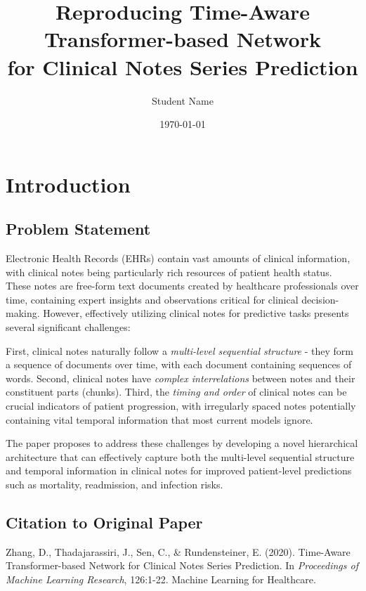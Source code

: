 \documentclass[10pt,letterpaper,twocolumn]{article}
\title{\textbf{Reproducing Time-Aware Transformer-based Network\\for Clinical Notes Series Prediction}}
\author{Student Name}
\date{\today}
\begin{document}
\twocolumn[
  \begin{@twocolumnfalse}
    \maketitle
    \thispagestyle{empty}
  \end{@twocolumnfalse}
]

\section{Introduction}

\subsection{Problem Statement}
Electronic Health Records (EHRs) contain vast amounts of clinical information, with clinical notes being particularly rich resources of patient health status. These notes are free-form text documents created by healthcare professionals over time, containing expert insights and observations critical for clinical decision-making. However, effectively utilizing clinical notes for predictive tasks presents several significant challenges:

First, clinical notes naturally follow a \textit{multi-level sequential structure} - they form a sequence of documents over time, with each document containing sequences of words. Second, clinical notes have \textit{complex interrelations} between notes and their constituent parts (chunks). Third, the \textit{timing and order} of clinical notes can be crucial indicators of patient progression, with irregularly spaced notes potentially containing vital temporal information that most current models ignore.

The paper proposes to address these challenges by developing a novel hierarchical architecture that can effectively capture both the multi-level sequential structure and temporal information in clinical notes for improved patient-level predictions such as mortality, readmission, and infection risks.

\subsection{Citation to Original Paper}
Zhang, D., Thadajarassiri, J., Sen, C., \& Rundensteiner, E. (2020). Time-Aware Transformer-based Network for Clinical Notes Series Prediction. In \textit{Proceedings of Machine Learning Research}, 126:1-22. Machine Learning for Healthcare.
\end{document}
